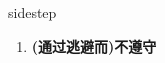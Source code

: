 
\begin{frame}
{\huge sidestep}
\begin{center}
\begin{enumerate}\Large
  \item \textbf{(通过逃避而)不遵守}
\end{enumerate}
\end{center}
\end{frame}

